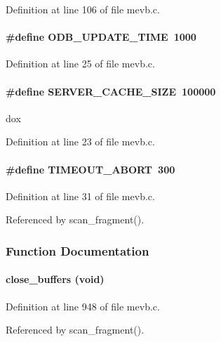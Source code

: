 Definition at line 106 of file mevb.c.
\paragraph[{ODB\_\-UPDATE\_\-TIME}]{\setlength{\rightskip}{0pt plus 5cm}\#define ODB\_\-UPDATE\_\-TIME~1000}\hfill\label{mevb_8c_a380a50d445745c2da54a29a1f2e5099e}


Definition at line 25 of file mevb.c.
\paragraph[{SERVER\_\-CACHE\_\-SIZE}]{\setlength{\rightskip}{0pt plus 5cm}\#define SERVER\_\-CACHE\_\-SIZE~100000}\hfill\label{mevb_8c_a022c39e327f494dda3664f8888f860f1}
dox 

Definition at line 23 of file mevb.c.
\paragraph[{TIMEOUT\_\-ABORT}]{\setlength{\rightskip}{0pt plus 5cm}\#define TIMEOUT\_\-ABORT~300}\hfill\label{mevb_8c_af15dc3019d3e199bca5c6d936f2b4c1d}


Definition at line 31 of file mevb.c.

Referenced by scan\_\-fragment().

\subsubsection{Function Documentation}
\paragraph[{close\_\-buffers}]{ close\_\-buffers (void)}\hfill\label{mevb_8c_a091f4532881474587352f1b2d36e86d0}


Definition at line 948 of file mevb.c.

Referenced by scan\_\-fragment().
